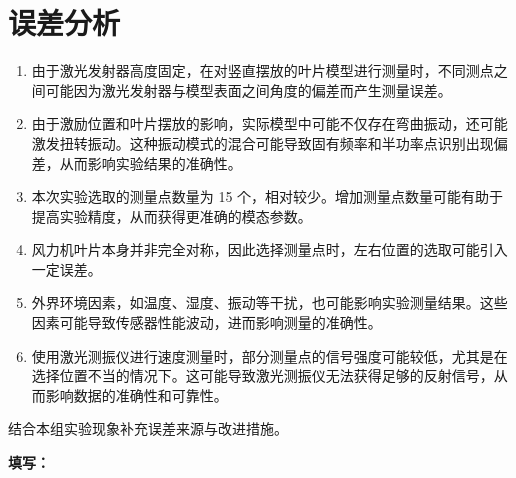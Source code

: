 \documentclass[UTF8,a4paper,12pt]{ctexart}
\newcommand{\blank}[1][2.5cm]{\mbox{\underline{\hspace{#1}}}}
\newcommand{\answer}{\par\noindent\textbf{填写：}\blank[0.86\textwidth]\par}
\numberwithin{equation}{section}
\begin{document}
\section{误差分析}
\begin{enumerate}
  \item 由于激光发射器高度固定，在对竖直摆放的叶片模型进行测量时，不同测点之间可能因为激光发射器与模型表面之间角度的偏差而产生测量误差。
  \item 由于激励位置和叶片摆放的影响，实际模型中可能不仅存在弯曲振动，还可能激发扭转振动。这种振动模式的混合可能导致固有频率和半功率点识别出现偏差，从而影响实验结果的准确性。
  \item 本次实验选取的测量点数量为 15 个，相对较少。增加测量点数量可能有助于提高实验精度，从而获得更准确的模态参数。
  \item 风力机叶片本身并非完全对称，因此选择测量点时，左右位置的选取可能引入一定误差。
  \item 外界环境因素，如温度、湿度、振动等干扰，也可能影响实验测量结果。这些因素可能导致传感器性能波动，进而影响测量的准确性。
  \item 使用激光测振仪进行速度测量时，部分测量点的信号强度可能较低，尤其是在选择位置不当的情况下。这可能导致激光测振仪无法获得足够的反射信号，从而影响数据的准确性和可靠性。
\end{enumerate}
结合本组实验现象补充误差来源与改进措施。
\answer
\end{document}

